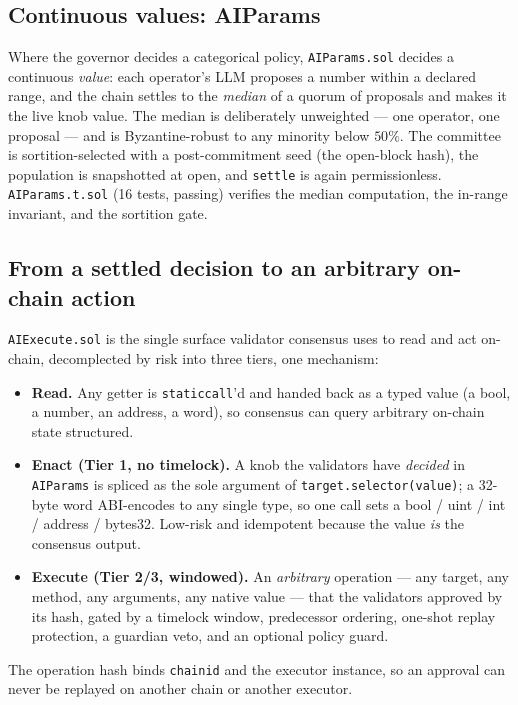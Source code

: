 \documentclass[11pt,a4paper]{article}
\begin{document}
\subsection{Continuous values: AIParams}\label{sec:params}

Where the governor decides a categorical policy, \texttt{AIParams.sol} decides a continuous \emph{value}: each operator's LLM proposes a number within a declared range, and the chain settles to the \emph{median} of a quorum of proposals and makes it the live knob value. The median is deliberately unweighted --- one operator, one proposal --- and is Byzantine-robust to any minority below $50\%$. The committee is sortition-selected with a post-commitment seed (the open-block hash), the population is snapshotted at open, and \texttt{settle} is again permissionless. \texttt{AIParams.t.sol} (16 tests, passing) verifies the median computation, the in-range invariant, and the sortition gate.

\subsection{From a settled decision to an arbitrary on-chain action}\label{sec:execute}

\texttt{AIExecute.sol} is the single surface validator consensus uses to read and act on-chain, decomplected by risk into three tiers, one mechanism:
\begin{itemize}
  \item \textbf{Read.} Any getter is \texttt{staticcall}'d and handed back as a typed value (a bool, a number, an address, a word), so consensus can query arbitrary on-chain state structured.
  \item \textbf{Enact (Tier 1, no timelock).} A knob the validators have \emph{decided} in \texttt{AIParams} is spliced as the sole argument of \texttt{target.selector(value)}; a 32-byte word ABI-encodes to any single type, so one call sets a bool / uint / int / address / bytes32. Low-risk and idempotent because the value \emph{is} the consensus output.
  \item \textbf{Execute (Tier 2/3, windowed).} An \emph{arbitrary} operation --- any target, any method, any arguments, any native value --- that the validators approved by its hash, gated by a timelock window, predecessor ordering, one-shot replay protection, a guardian veto, and an optional policy guard.
\end{itemize}
The operation hash binds \texttt{chainid} and the executor instance, so an approval can never be replayed on another chain or another executor.
\end{document}
